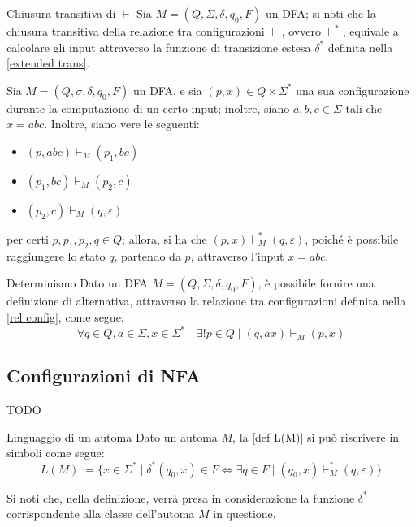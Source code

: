 \documentclass[a4paper, 12pt]{report}
\begin{document}
    \begin{framedobs}{Chiusura transitiva di $\vdash$}
        Sia $M = (Q, \Sigma, \delta, q_0, F)$ un DFA; si noti che la chiusura transitiva della relazione tra configurazioni $\vdash$, ovvero $\vdash^*$, equivale a calcolare gli input attraverso la funzione di transizione estesa $\delta^*$ definita nella \cref{extended trans}.
    \end{framedobs}

    \begin{example}
        Sia $M = (Q, \sigma, \delta, q_0, F)$ un DFA, e sia $(p, x) \in Q \times \Sigma ^*$ una sua configurazione durante la computazione di un certo input; inoltre, siano $a, b, c \in \Sigma$ tali che $x = abc$. Inoltre, siano vere le seguenti:

        \begin{itemize}
            \item $(p, abc) \vdash_M (p_1, bc)$
            \item $(p_1, bc) \vdash_M (p_2, c)$
            \item $(p_2, c) \vdash_M (q, \varepsilon)$
        \end{itemize}

        per certi $p, p_1, p_2, q \in Q$; allora, si ha che $(p, x) \vdash_M^* (q, \varepsilon)$, poiché è possibile raggiungere lo stato $q$, partendo da $p$, attraverso l'input $x = abc$.
    \end{example}

    \begin{framedobs}{Determinismo}
        Dato un DFA $M = (Q, \Sigma, \delta, q_0, F)$, è possibile fornire una definizione di  alternativa, attraverso la relazione tra configurazioni definita nella \cref{rel config}, come segue: $$\forall q \in Q, a \in \Sigma, x \in \Sigma ^* \quad \exists ! p \in Q \mid (q, ax) \vdash_M (p, x)$$
    \end{framedobs}

    \subsection{Configurazioni di NFA}

    TODO

    \begin{framedobs}{Linguaggio di un automa}
        Dato un automa $M$, la \cref{def L(M)} si può riscrivere in simboli come segue: $$L(M) := \{x \in \Sigma ^* \mid \delta^*(q_0, x) \in F \iff \exists q \in F \mid (q_0, x) \vdash_M^* (q, \varepsilon)\}$$

        Si noti che, nella definizione, verrà presa in considerazione la funzione $\delta^*$ corrispondente alla classe dell'automa $M$ in questione.
    \end{framedobs}
\end{document}
